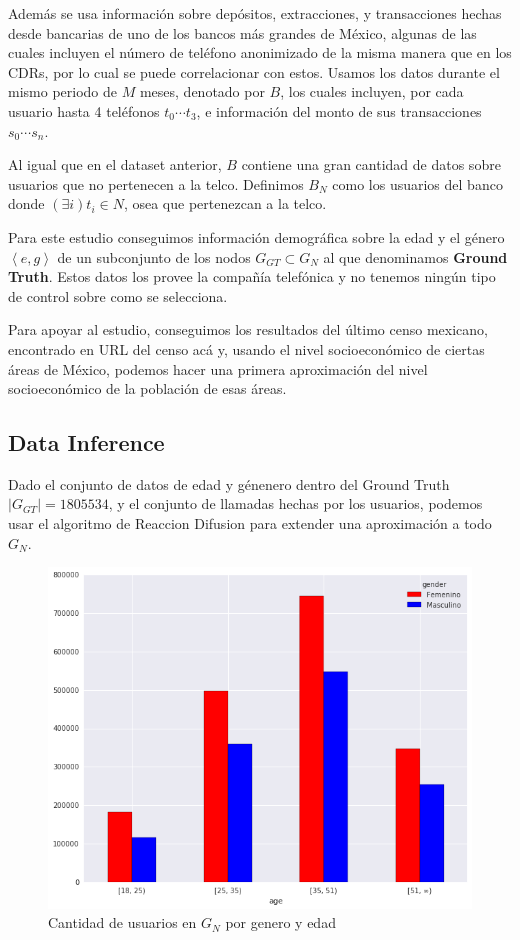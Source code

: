 \documentclass{llncs}
\begin{document}
Además se usa información sobre depósitos, extracciones, y transacciones hechas desde bancarias de uno de los bancos más grandes de México, algunas de las cuales incluyen el número de teléfono anonimizado de la misma manera que en los CDRs, por lo cual se puede correlacionar con estos. Usamos los datos durante el mismo periodo de \( M \) meses, denotado por \( B \), los cuales incluyen, por cada usuario hasta 4 teléfonos \( t_0 \cdots t_3 \), e información del monto de sus transacciones \( s_0 \cdots s_n \).

Al igual que en el dataset anterior, \( B \) contiene una gran cantidad de datos sobre usuarios que no pertenecen a la telco. Definimos \( B_N \) como los usuarios del banco donde \( \left( \exists i \right) t_i \in N \), osea que pertenezcan a la telco.

Para este estudio conseguimos información demográfica sobre la edad y el género \( \left<e, g\right> \) de un subconjunto de los nodos \( G_{GT} \subset G_N \) al que denominamos \textbf{Ground Truth}. Estos datos los provee la compañía telefónica y no tenemos ningún tipo de control sobre como se selecciona.

Para apoyar al estudio, conseguimos los resultados del último censo mexicano, encontrado en {URL del censo acá} y, usando el nivel socioeconómico de ciertas áreas de México, podemos hacer una primera aproximación del nivel socioeconómico de la población de esas áreas.


\subsection{Data Inference}

Dado el conjunto de datos de edad y génenero dentro del Ground Truth \( \left|G_{GT}\right| = 1805534 \), y el conjunto de llamadas hechas por los usuarios, podemos usar el algoritmo de Reaccion Difusion \cite{brea2014} para extender una aproximación a todo \( G_N \).

\begin{figure}
\center
\includegraphics[width=\columnwidth]{Figures/gender_age_bar}
\caption{Cantidad de usuarios en \( G_N \) por genero y edad}
\end{figure}
\end{document}
